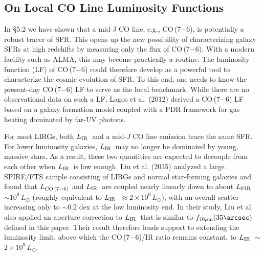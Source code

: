 \documentclass[preprint]{aastex}
\newcommand{\LIR}{\mbox{$L_{\rm IR}$}}
\newcommand{\LFIR}{\mbox{$L_{\rm FIR}$}}
\begin{document}






\subsection{On Local CO Line Luminosity Functions} \label{sec5.5}


In \S5.2 we have shown that a mid-J CO line, e.g., CO\,(7$-$6), is potentially 
a robust tracer of SFR.   This opens up the new possibility of characterizing 
galaxy SFRs at high redshifts by measuring only the flux of CO\,(7$-$6).  With a modern 
facility such as ALMA, this may become practically a routine.  The luminosity 
function (LF) of CO\,(7$-$6) could therefore develop as a powerful tool to 
characterize the cosmic evolution of SFR.  To this end, one needs to know 
the present-day CO\,(7$-$6) LF to serve as the local benchmark.  While there are 
no observational data on such a LF, Lagos et al. (2012) derived a CO\,(7$-$6) LF 
based on a galaxy formation model coupled with a PDR framework for gas heating 
dominated by far-UV photons.


For most LIRGs,  both \LIR\ and a mid-$J$ CO line emission trace the same SFR.
For lower luminosity galaxies, \LIR\ may no longer be dominated by young, massive
stars.  As a result, these two quantities are expected to decouple from each 
other when \LIR\ is low enough.  Liu et al. (2015) analyzed a large
SPIRE/FTS sample consisting of LIRGs and normal star-forming galaxies and 
found that $L_{\rm CO\,(7-6)}$ and \LIR\ are coupled nearly linearly down to about 
\LFIR\ $\sim 10^9\,L_{\odot}$ (roughly equivalent to \LIR\ $\approx 2 \times
10^9\,L_{\odot}$), with an overall scatter increasing only to $\sim$0.2 dex
at the low luminosity end.  In their study, Liu et al. also applied an aperture
correction to \LIR\ that is similar to $f_{70\mu{\rm m}}(35\arcsec)$ defined 
in this paper.  Their result therefore lends support to extending the 
luminosity limit, above which the CO\,(7$-$6)/IR ratio remains constant, to 
\LIR\ $\sim$ $2 \times 10^9\,L_{\odot}$.  
\end{document}
